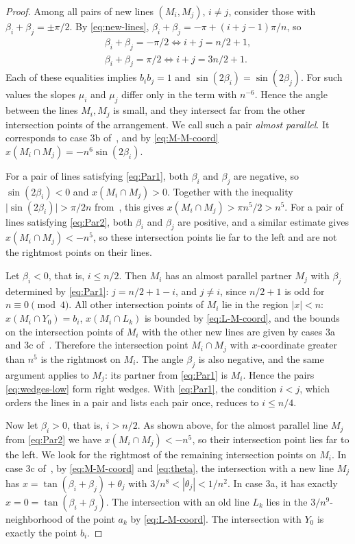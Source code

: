 \begin{proof}
Among all pairs of new lines $(M_i,M_j)$, $i\neq j$, consider those with $\beta_i+\beta_j=\pm\pi/2$.
By \eqref{eq:new-lines}, $\beta_i+\beta_j=-\pi+(i+j-1)\pi/n$, so
\begin{gather}
\beta_i+\beta_j=-\pi/2 \iff i+j=n/2+1,\label{eq:Par1}\\
\beta_i+\beta_j=\pi/2 \iff i+j=3n/2+1.\label{eq:Par2}
\end{gather}
Each of these equalities implies $b_ib_j=1$ and $\sin(2\beta_i)=\sin(2\beta_j)$.
For such values the slopes $\mu_i$ and $\mu_j$ differ only in the term with $n^{-6}$. Hence the angle between the lines $M_i,M_j$ is small, and they intersect far from the other intersection points of the arrangement.
We call such a pair \emph{almost parallel}. It corresponds to case 3b of~\cite[Prop.~3.1]{bbl}, and by \eqref{eq:M-M-coord} $x(M_i\cap M_j)=-n^6\sin(2\beta_i)$.

For a pair of lines satisfying \eqref{eq:Par1}, both $\beta_i$ and $\beta_j$ are negative, so $\sin(2\beta_i)<0$ and $x(M_i\cap M_j)>0$. Together with the inequality $\lvert\sin(2\beta_i)\rvert>\pi/2n$ from~\cite[(3)]{bbl}, this gives $x(M_i\cap M_j)>\pi n^5/2>n^5$.
For a pair of lines satisfying \eqref{eq:Par2}, both $\beta_i$ and $\beta_j$ are positive, and a similar estimate gives $x(M_i\cap M_j)<-n^5$, so these intersection points lie far to the left and are not the rightmost points on their lines.

Let $\beta_i<0$, that is, $i\le n/2$.
Then $M_i$ has an almost parallel partner $M_j$ with $\beta_j$ determined by \eqref{eq:Par1}: $j=n/2+1-i$, and $j\neq i$, since $n/2+1$ is odd for $n\equiv0\pmod4$.
All other intersection points of $M_i$ lie in the region $|x|<n$: $x(M_i\cap Y_0)=b_i$, $x(M_i\cap L_k)$
is bounded by \eqref{eq:L-M-coord}, and the bounds on the intersection points of $M_i$ with the other new lines are given by cases 3a and 3c of~\cite[Prop.~3.1]{bbl}.
Therefore the intersection point $M_i\cap M_j$ with $x$-coordinate greater than $n^5$ is the rightmost on $M_i$.
The angle $\beta_j$ is also negative, and the same argument applies to $M_j$: its partner from \eqref{eq:Par1} is $M_i$.
Hence the pairs \eqref{eq:wedges-low} form right wedges.
With \eqref{eq:Par1}, the condition $i<j$, which orders the lines in a pair and lists each pair once, reduces to $i\le n/4$.

Now let $\beta_i>0$, that is, $i>n/2$.
As shown above, for the almost parallel line $M_j$ from \eqref{eq:Par2} we have $x(M_i\cap M_j)<-n^5$, so their intersection point lies far to the left.
We look for the rightmost of the remaining intersection points on $M_i$. In case 3c of~\cite[Prop.~3.1]{bbl}, by \eqref{eq:M-M-coord} and \eqref{eq:theta}, the intersection with a new line $M_j$ has $x=\tan(\beta_i+\beta_j)+\theta_j$ with $3/n^8<|\theta_j|<1/n^2$. In case 3a, it has exactly $x=0=\tan(\beta_i+\beta_j)$. The intersection with an old line $L_k$ lies in the $3/n^{9}$-neighborhood of the point $a_k$ by \eqref{eq:L-M-coord}. The intersection with $Y_0$ is exactly the point $b_i$.


\end{proof}
